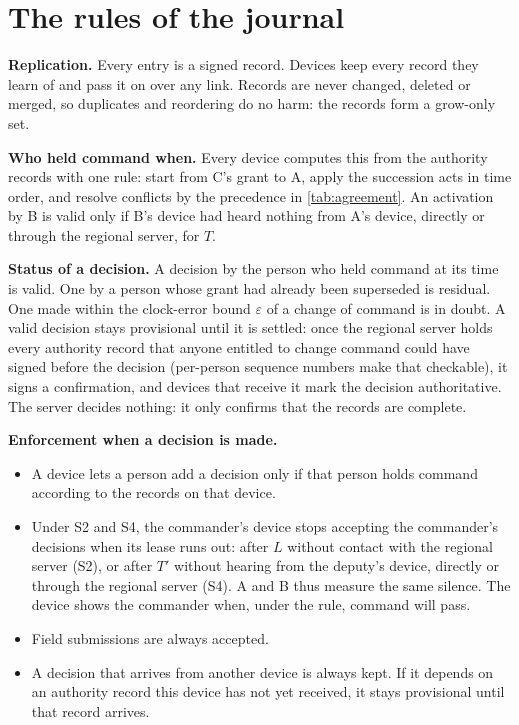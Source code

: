 \documentclass[11pt,a4paper]{article}
\begin{document}
\section{The rules of the journal}
\label{sec:rules}

\textbf{Replication.} Every entry is a signed record. Devices keep every record they learn
of and pass it on over any link. Records are never changed, deleted or merged, so
duplicates and reordering do no harm: the records form a grow-only set.

\textbf{Who held command when.} Every device computes this from the authority records with
one rule: start from C's grant to A, apply the succession acts in time order, and resolve
conflicts by the precedence in \cref{tab:agreement}. An activation by B is valid only if B's
device had heard nothing from A's device, directly or through the regional server, for $T$.

\textbf{Status of a decision.} A decision by the person who held command at its time is
valid. One by a person whose grant had already been superseded is residual. One made within
the clock-error bound $\varepsilon$ of a change of command is in doubt. A valid decision stays
provisional until it is settled: once the regional server holds every authority record that
anyone entitled to change command could have signed before the decision (per-person
sequence numbers make that checkable), it signs a confirmation, and devices that receive it
mark the decision authoritative. The server decides nothing: it only confirms that the
records are complete.

\textbf{Enforcement when a decision is made.}
\begin{itemize}
  \item A device lets a person add a decision only if that person holds command according to
        the records on that device.
  \item Under S2 and S4, the commander's device stops accepting the commander's decisions
        when its lease runs out: after $L$ without contact with the regional server (S2), or
        after $T'$ without hearing from the deputy's device, directly or through the regional
        server (S4). A and B thus measure the same silence. The device shows the commander
        when, under the rule, command will pass.
  \item Field submissions are always accepted.
  \item A decision that arrives from another device is always kept. If it depends on an
        authority record this device has not yet received, it stays provisional until that
        record arrives.
\end{itemize}
\end{document}
